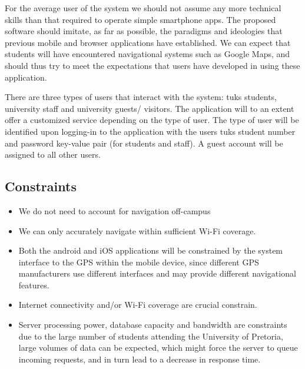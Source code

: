\documentclass[12pt,a4paper]{article}
\begin{document}
			\begin{flushleft}
			For the average user of the system we should not assume any more technical
			skills than that required to operate simple smartphone apps. The proposed
			software should imitate, as far as possible, the paradigms and ideologies
			that previous mobile and browser applications have established. We can
			expect that students will have encountered navigational systems such as
			Google Maps, and should thus try to meet the expectations that users have
			developed in using these application.
			\end{flushleft}
		
			\begin{flushleft}
			There are three types of users that interact with the system: tuks students, university staff and 				university guests/ visitors. The application will to an extent offer a customized service depending on 				the type of user. The type of user will be identified upon logging-in to the application with the users 			tuks student number and password key-value pair (for students and staff). A guest account will be 				assigned to all other users.
			\end{flushleft}

		\subsection{Constraints}

			\begin{itemize}

				\item We do not need to account for navigation off-campus
				\item We can only accurately navigate within sufficient Wi-Fi coverage.
				\item Both the android and iOS applications will be constrained by the system 
				interface to the GPS within the mobile device, since different GPS manufacturers 
				use different interfaces and may provide different navigational features.
				\item Internet connectivity and/or Wi-Fi coverage are crucial constrain.
				\item Server processing power, database capacity and bandwidth are constraints 
				due to the large number of students attending the University of Pretoria, large 
				volumes of data can be expected, which might force the server to queue incoming 
				requests, and in turn lead to a decrease in response time.

			\end{itemize}
\end{document}
